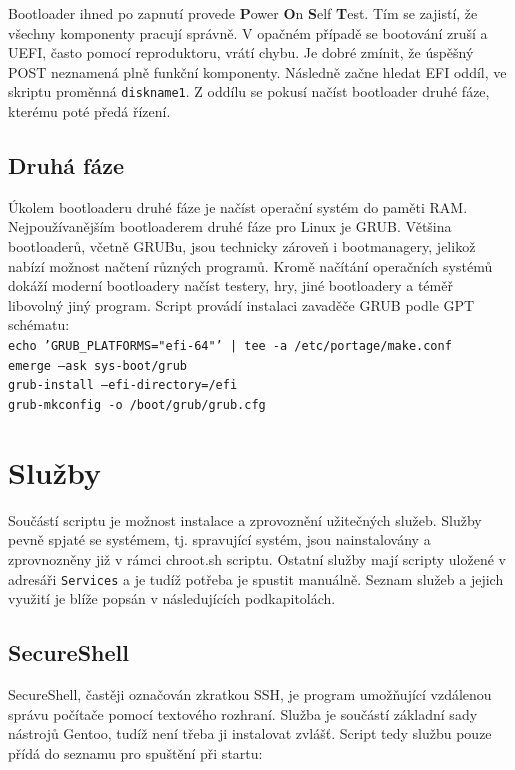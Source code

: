 \documentclass[12pt,a4paper,twoside,]{article}
\begin{document}
{{{{{{\hspace{-1.5em}Bootloader ihned po zapnutí provede {\bf P}ower {\bf O}n {\bf S}elf {\bf T}est. Tím se zajistí, že všechny komponenty pracují správně. V opačném případě se bootování zruší a UEFI, často pomocí reproduktoru, vrátí chybu. Je dobré zmínit, že úspěšný POST neznamená plně funkční komponenty. Následně začne hledat EFI oddíl, ve skriptu proměnná \texttt{diskname1}. Z oddílu se pokusí načíst bootloader druhé fáze, kterému poté předá řízení.

\subsection{\textsf{Druhá fáze}}
Úkolem bootloaderu druhé fáze je načíst operační systém do paměti RAM. Nejpoužívanějším bootloaderem druhé fáze pro Linux je GRUB. Většina bootloaderů, včetně GRUBu, jsou technicky zároveň i bootmanagery, jelikož nabízí možnost načtení různých programů. Kromě načítání operačních systémů dokáží moderní bootloadery načíst testery, hry, jiné bootloadery a téměř libovolný jiný program. Script provádí instalaci zavaděče GRUB podle GPT schématu:\\

\texttt{echo 'GRUB\_PLATFORMS="efi-64"' | tee -a /etc/portage/make.conf}\\
\hspace*{1.5em}\texttt{emerge --ask sys-boot/grub}\\
\hspace*{1.5em}\texttt{grub-install --efi-directory=/efi}\\
\hspace*{1.5em}\texttt{grub-mkconfig -o /boot/grub/grub.cfg}\\

\newpage
\section{\textsf{Služby}}
Součástí scriptu je možnost instalace a zprovoznění užitečných služeb. Služby pevně spjaté se systémem, tj. spravující systém, jsou nainstalovány a zprovnozněny již v rámci chroot.sh scriptu. Ostatní služby mají scripty uložené v adresáři \texttt{Services} a je tudíž potřeba je spustit manuálně. Seznam služeb a jejich využití je blíže popsán v následujících podkapitolách. 

\subsection{\textsf{SecureShell}}
SecureShell, častěji označován zkratkou SSH, je program umožňující vzdálenou správu počítače pomocí textového rozhraní. Služba je součástí základní sady nástrojů Gentoo, tudíž není třeba ji instalovat zvlášť. Script tedy službu pouze přídá do seznamu pro spuštění při startu: 

}}}}}}
\end{document}
